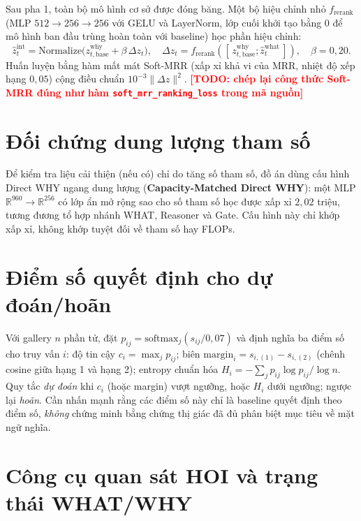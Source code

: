 \documentclass[12pt,a4paper]{report}
\newcommand{\TODO}[1]{\textcolor{red}{\textbf{[TODO: #1]}}}
\begin{document}
Sau pha 1, toàn bộ mô hình cơ sở được đóng băng. Một bộ hiệu chỉnh nhỏ $f_{\mathrm{rerank}}$ (MLP $512\to256\to256$ với GELU và LayerNorm, lớp cuối khởi tạo bằng 0 để mô hình ban đầu trùng hoàn toàn với baseline) học phần hiệu chỉnh:
\begin{equation}
    \hat{z}_t^{\mathrm{int}} = \mathrm{Normalize}\bigl(z_{t,\mathrm{base}}^{\mathrm{why}} + \beta\,\Delta z_t\bigr), \quad \Delta z_t=f_{\mathrm{rerank}}([\,z_{t,\mathrm{base}}^{\mathrm{why}};\hat{z}_t^{\mathrm{what}}\,]),\quad \beta=0{,}20.
\end{equation}
Huấn luyện bằng hàm mất mát Soft-MRR (xấp xỉ khả vi của MRR, nhiệt độ xếp hạng $0{,}05$) cộng điều chuẩn $10^{-3}\lVert\Delta z\rVert^2$. \TODO{chép lại công thức Soft-MRR đúng như hàm \texttt{soft\_mrr\_ranking\_loss} trong mã nguồn}

\section{Đối chứng dung lượng tham số}

Để kiểm tra liệu cải thiện (nếu có) chỉ do tăng số tham số, đồ án dùng cấu hình Direct WHY ngang dung lượng (\textbf{Capacity-Matched Direct WHY}): một MLP $\mathbb{R}^{960}\to\mathbb{R}^{256}$ có lớp ẩn mở rộng sao cho số tham số học được xấp xỉ $2{,}02$ triệu, tương đương tổ hợp nhánh WHAT, Reasoner và Gate. Cấu hình này chỉ khớp xấp xỉ, không khớp tuyệt đối về tham số hay FLOPs.

\section{Điểm số quyết định cho dự đoán/hoãn}
\label{sec:decision_scores}

Với gallery $n$ phần tử, đặt $p_{ij}=\mathrm{softmax}_j(s_{ij}/0{,}07)$ và định nghĩa ba điểm số cho truy vấn $i$: độ tin cậy $c_i=\max_j p_{ij}$; biên $\mathrm{margin}_i = s_{i,(1)}-s_{i,(2)}$ (chênh cosine giữa hạng 1 và hạng 2); entropy chuẩn hóa $H_i=-\sum_j p_{ij}\log p_{ij}/\log n$. Quy tắc \emph{dự đoán} khi $c_i$ (hoặc margin) vượt ngưỡng, hoặc $H_i$ dưới ngưỡng; ngược lại \emph{hoãn}. Cần nhấn mạnh rằng các điểm số này chỉ là baseline quyết định theo điểm số, \emph{không} chứng minh bằng chứng thị giác đã đủ phân biệt mục tiêu về mặt ngữ nghĩa.

\section{Công cụ quan sát HOI và trạng thái WHAT/WHY}
\label{sec:viz_tool}
\end{document}
